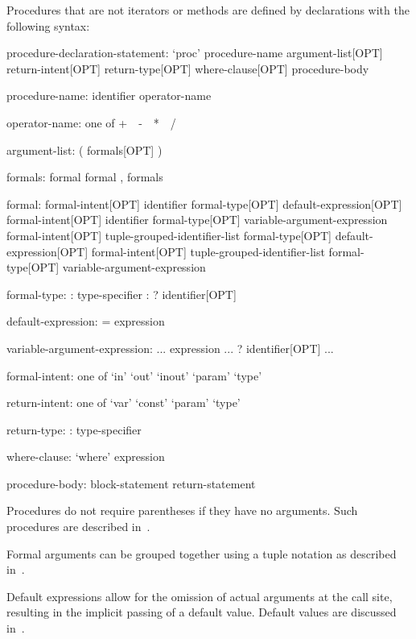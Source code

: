 Procedures that are not iterators or methods are defined by declarations
with the following syntax:
\begin{syntax}
procedure-declaration-statement:
  `proc' procedure-name argument-list[OPT] return-intent[OPT] return-type[OPT] where-clause[OPT]
    procedure-body

procedure-name:
  identifier
  operator-name


operator-name: one of
  + $ $ $ $ - $ $ $ $ * $ $ $ $ / $ $ $ $ %

argument-list:
  ( formals[OPT] )

formals:
  formal
  formal , formals

formal:
  formal-intent[OPT] identifier formal-type[OPT] default-expression[OPT]
  formal-intent[OPT] identifier formal-type[OPT] variable-argument-expression
  formal-intent[OPT] tuple-grouped-identifier-list formal-type[OPT] default-expression[OPT]
  formal-intent[OPT] tuple-grouped-identifier-list formal-type[OPT] variable-argument-expression

formal-type:
  : type-specifier
  : ? identifier[OPT]

default-expression:
  = expression

variable-argument-expression:
  ... expression
  ... ? identifier[OPT]
  ...

formal-intent: one of
  `in' `out' `inout' `param' `type'

return-intent: one of
  `var' `const' `param' `type'

return-type:
  : type-specifier

where-clause:
  `where' expression

procedure-body:
  block-statement
  return-statement
\end{syntax}


Procedures do not require parentheses if they have no arguments.  Such
procedures are described in~.

Formal arguments can be grouped together using a tuple notation as
described in~.

Default expressions allow for the omission of actual arguments at the
call site, resulting in the implicit passing of a default value.
Default values are discussed in~.

